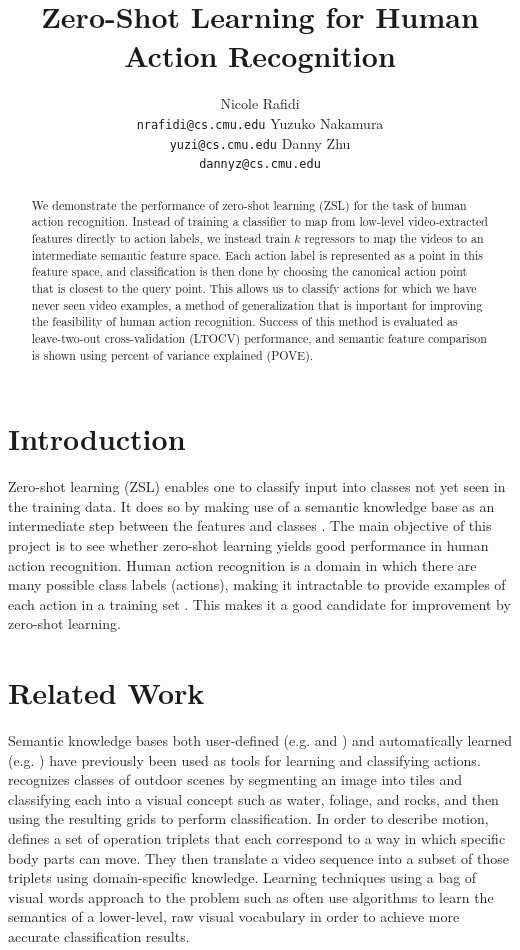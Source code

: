\documentclass{article}
\title{Zero-Shot Learning for Human Action Recognition}
\author{Nicole Rafidi \\
  \texttt{nrafidi@cs.cmu.edu}
  \And
  Yuzuko Nakamura \\
  \texttt{yuzi@cs.cmu.edu}
  \And
  Danny Zhu \\
  \texttt{dannyz@cs.cmu.edu}
}
\begin{document}
\maketitle
\begin{abstract}
We demonstrate the performance of zero-shot learning (ZSL) for the task of human action recognition. Instead of training a classifier to map from low-level video-extracted features directly to action labels, we instead train $k$ regressors to map the videos to an intermediate semantic feature space.  Each action label is represented as a point in this feature space, and classification is then done by choosing the canonical action point that is closest to the query point.  This allows us to classify actions for which we have never seen video examples, a method of generalization that is important for improving the feasibility of human action recognition. Success of this method is evaluated as leave-two-out cross-validation (LTOCV) performance, and semantic feature comparison is shown using percent of variance explained (POVE).
\end{abstract}
\section{Introduction}
Zero-shot learning (ZSL) enables one to classify input into classes not yet seen in the training data. It does so by making use of a semantic knowledge base as an intermediate step between the features and classes \cite{Palatucci09}. The main objective of this project is to see whether zero-shot learning yields good performance in human action recognition. Human action recognition is a domain in which there are many possible class labels (actions), making it intractable to provide examples of each action in a training set \cite{Poppe10}. This makes it a good candidate for improvement by zero-shot learning.

\section{Related Work}

Semantic knowledge bases both user-defined (e.g. \cite{Vogel07} and \cite{Park04}) and automatically learned (e.g. \cite{Zhao10}) have previously been used as tools for learning and classifying actions. \cite{Vogel07} recognizes classes of outdoor scenes by segmenting an image into tiles and classifying each into a visual concept such as water, foliage, and rocks, and then using the resulting grids to perform classification. In order to describe motion, \cite{Park04} defines a set of operation triplets that each correspond to a way in which specific body parts can move. They then translate a video sequence into a subset of those triplets using domain-specific knowledge. Learning techniques using a bag of visual words approach to the problem such as \cite{Zhao10} often use algorithms to learn the semantics of a lower-level, raw visual vocabulary in order to achieve more accurate classification results.
\end{document}
